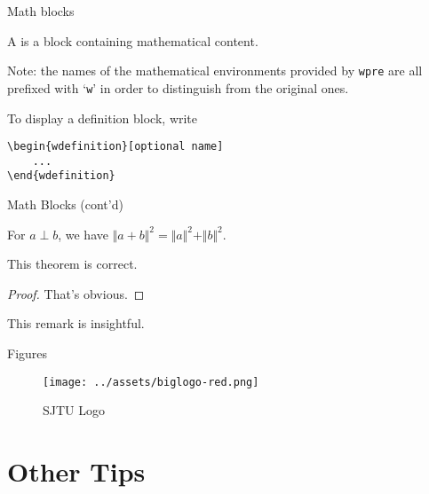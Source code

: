 \documentclass[no-math, aspectratio=1610, 10pt]{beamer}
\begin{document}
    \begin{frame}[fragile]{Math blocks}
        \begin{wdefinition}
            A  is a block containing mathematical content.
        \end{wdefinition}

        \alert{Note:} the names of the mathematical environments provided by \texttt{wpre} are all prefixed with `\texttt{w}' in order to distinguish from the original ones.

        \begin{wexample}
            To display a definition block, write
            \begin{verbatim}
\begin{wdefinition}[optional name]
    ...
\end{wdefinition}\end{verbatim}
        \end{wexample}
    \end{frame}

    \begin{frame}{Math Blocks (cont'd)}
        \begin{wlemma}
            For $a\perp b$, we have $\Vert a + b\Vert^2 = \Vert a\Vert^2 + \Vert b\Vert^2$.
        \end{wlemma}

        \begin{wtheorem}
            This theorem is correct.
        \end{wtheorem}

        \begin{proof}
            That's obvious.
        \end{proof}

        \begin{wremark}
            This remark is insightful.
        \end{wremark}
    \end{frame}

    \begin{frame}{Figures}
        \begin{figure}
            \texttt{[image: ../assets/biglogo-red.png]}
            \caption{SJTU Logo}
        \end{figure}
    \end{frame}

    \section{Other Tips}
\end{document}
